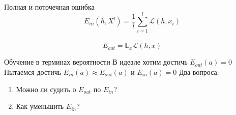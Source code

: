 \documentclass[10pt]{beamer}
\begin{document}


\begin{frame}{Полная и поточечная ошибка}  
  $$E_{in}(h, X^l) = \frac{1}{l} \sum\limits_{i=1}^l \mathcal{L}(h, x_i)$$\\
  \bigbreak
  $$E_{out} = \mathbb{E}_x \mathcal{L}(h, x) $$
\end{frame}

%

\begin{frame}{Обучение в терминах вероятности}  
  В идеале хотим достичь $E_{out}(a) = 0$\\
  \bigbreak
  Пытаемся достичь $E_{in}(a) \approx E_{out}(a)$ и $E_{in}(a) = 0$
  \bigbreak
  \pause
  Два вопроса:\\
  \begin{enumerate}
    \item Можно ли судить о $E_{out}$ по $E_{in}$?
    \item Как уменьшить $E_{in}$?
  \end{enumerate}
\end{frame}
\end{document}
